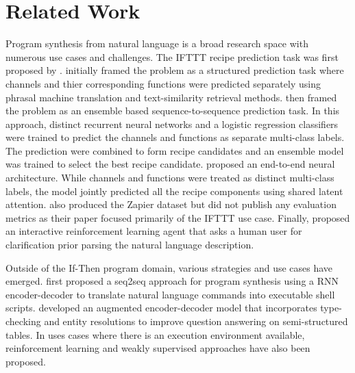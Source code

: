 \documentclass[letterpaper]{article} %
\begin{document}
\section{Related Work}
Program synthesis from natural language is a broad research space with numerous use cases and challenges. The IFTTT recipe prediction task was first proposed by \citeauthor{quirk-etal-2015-language}. \citeauthor{quirk-etal-2015-language} initially framed the problem as a structured prediction task where channels and thier corresponding functions were predicted separately using phrasal machine translation and text-similarity retrieval methods. \citeauthor{beltagy-quirk-2016-improved} \citeyear{beltagy-quirk-2016-improved} then framed the problem as an ensemble based sequence-to-sequence prediction task. In this approach, distinct recurrent neural networks and a logistic regression classifiers were trained to predict the channels and functions as separate multi-class labels. The prediction were combined to form recipe candidates and an ensemble model was trained to select the best recipe candidate. \citeauthor{chen2016latent} \citeyear{chen2016latent} proposed an end-to-end neural architecture. While channels and functions were treated as distinct multi-class labels, the model jointly predicted all the recipe components using shared latent attention. \cite{chen2016latent} also produced the Zapier dataset but did not publish any evaluation metrics as their paper focused primarily of the IFTTT use case. Finally, \citeauthor{DBLP:journals/corr/abs-1808-06740} \citeyear{DBLP:journals/corr/abs-1808-06740} proposed an interactive reinforcement learning agent that asks a human user for clarification prior parsing the natural language description.

Outside of the If-Then program domain, various strategies and use cases have emerged. \citeauthor{Lin2017ProgramSF} \citeyear{Lin2017ProgramSF} first proposed a seq2seq approach for program synthesis using a RNN encoder-decoder to translate natural language commands into executable shell scripts. \citeauthor{krishnamurthy-etal-2017-neural} \citeyear{krishnamurthy-etal-2017-neural} developed an augmented encoder-decoder model that incorporates type-checking and entity resolutions to improve question answering on semi-structured tables. In uses cases where there is an execution environment available, reinforcement learning and weakly supervised approaches have also been proposed.
\end{document}
